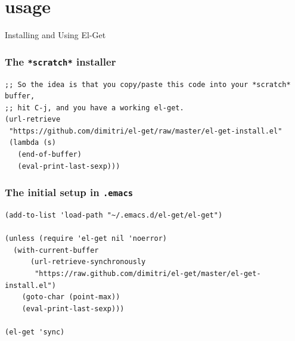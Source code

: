\documentclass{beamer}
\begin{document}

\section{usage}

\begin{frame}[fragile]
  \begin{center}
    \Huge{Installing and Using El-Get}
  \end{center}
\end{frame}

\begin{frame}[fragile]
  \frametitle{The \texttt{*scratch*} installer}

  \begin{verbatim}
;; So the idea is that you copy/paste this code into your *scratch* buffer,
;; hit C-j, and you have a working el-get.
(url-retrieve
 "https://github.com/dimitri/el-get/raw/master/el-get-install.el"
 (lambda (s)
   (end-of-buffer)
   (eval-print-last-sexp)))
  \end{verbatim}
\end{frame}

\begin{frame}[fragile]
  \frametitle{The initial setup in \texttt{.emacs}}

  \begin{verbatim}
(add-to-list 'load-path "~/.emacs.d/el-get/el-get")

(unless (require 'el-get nil 'noerror)
  (with-current-buffer
      (url-retrieve-synchronously
       "https://raw.github.com/dimitri/el-get/master/el-get-install.el")
    (goto-char (point-max))
    (eval-print-last-sexp)))

(el-get 'sync)
  \end{verbatim}
\end{frame}
\end{document}
